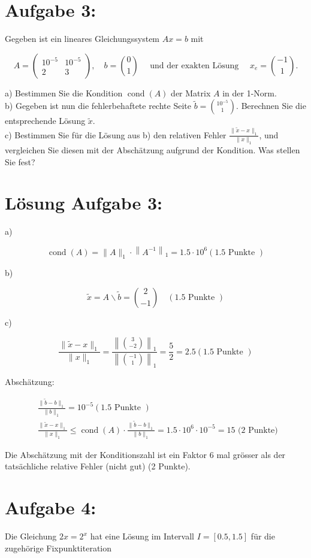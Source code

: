 \documentclass[10pt]{article}
\begin{document}
\section*{Aufgabe 3:}
Gegeben ist ein lineares Gleichungssystem $A x=b$ mit

$$
A=\left(\begin{array}{cc}
10^{-5} & 10^{-5} \\
2 & 3
\end{array}\right), \quad b=\binom{0}{1} \quad \text { und der exakten Lösung } \quad x_{e}=\binom{-1}{1} .
$$

a) Bestimmen Sie die Kondition $\operatorname{cond}(A)$ der Matrix $A$ in der 1-Norm.\\
b) Gegeben ist nun die fehlerbehaftete rechte Seite $\tilde{b}=\binom{10^{-5}}{1}$. Berechnen Sie die entsprechende Lösung $\tilde{x}$.\\
c) Bestimmen Sie für die Lösung aus b) den relativen Fehler $\frac{\|\tilde{x}-x\|_{1}}{\|x\|_{1}}$, und vergleichen Sie diesen mit der Abschätzung aufgrund der Kondition. Was stellen Sie fest?

\section*{Lösung Aufgabe 3:}
a)

$$
\operatorname{cond}(A)=\|A\|_{1} \cdot\left\|A^{-1}\right\|_{1}=1.5 \cdot 10^{6}(1.5 \text { Punkte })
$$

b)

$$
\tilde{x}=A \backslash \tilde{b}=\binom{2}{-1} \quad(1.5 \text { Punkte })
$$

c)

$$
\frac{\|\tilde{x}-x\|_{1}}{\|x\|_{1}}=\frac{\left\|\binom{3}{-2}\right\|_{1}}{\left\|\binom{-1}{1}\right\|_{1}}=\frac{5}{2}=2.5(1.5 \text { Punkte })
$$

Abschätzung:

$$
\begin{aligned}
& \frac{\|\tilde{b}-b\|_{1}}{\|b\|_{1}}=10^{-5}(1.5 \text { Punkte }) \\
& \frac{\|\tilde{x}-x\|_{1}}{\|x\|_{1}} \leq \operatorname{cond}(A) \cdot \frac{\|\tilde{b}-b\|_{1}}{\|b\|_{1}}=1.5 \cdot 10^{6} \cdot 10^{-5}=15 \text { (2 Punkte) }
\end{aligned}
$$

Die Abschätzung mit der Konditionszahl ist ein Faktor 6 mal grösser als der tatsächliche relative Fehler (nicht gut) (2 Punkte).

\section*{Aufgabe 4:}
Die Gleichung $2 x=2^{x}$ hat eine Lösung im Intervall $I=[0.5,1.5]$ für die zugehörige Fixpunktiteration
\end{document}

